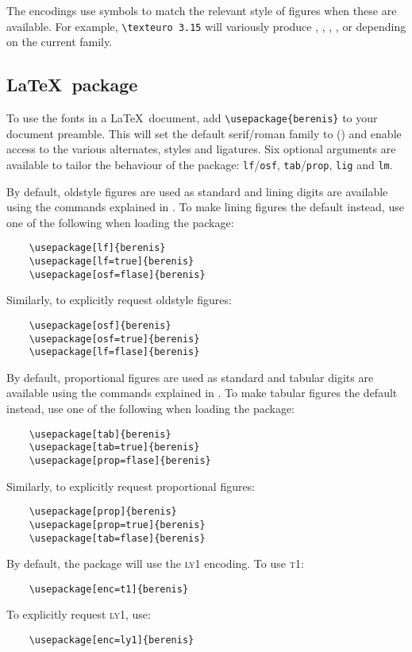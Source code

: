 \documentclass[11pt,british]{article}
\begin{document}
The encodings use symbols to match the relevant style of figures when these are available. For example, \verb|\texteuro 3.15| will variously produce , , , ,  or  depending on the current family.


\subsection{\LaTeX\ package}

To use the fonts in a \LaTeX\ document, add \verb|\usepackage{berenis}| to your document preamble. This will set the default serif/roman family to  () and enable access to the various alternates, styles and ligatures. Six optional arguments are available to tailor the behaviour of the package: \verb|lf|/\verb|osf|, \verb|tab|/\verb|prop|, \verb|lig| and \verb|lm|.

By default, oldstyle figures are used as standard and lining digits are available using the commands explained in . To make lining figures the default instead, use one of the following when loading the package:
\begin{verbatim}
	\usepackage[lf]{berenis}
	\usepackage[lf=true]{berenis}
	\usepackage[osf=flase]{berenis}
\end{verbatim}
Similarly, to explicitly request oldstyle figures:
\begin{verbatim}
	\usepackage[osf]{berenis}
	\usepackage[osf=true]{berenis}
	\usepackage[lf=flase]{berenis}
\end{verbatim}

By default, proportional figures are used as standard and tabular digits are available using the commands explained in . To make tabular figures the default instead, use one of the following when loading the package:
\begin{verbatim}
	\usepackage[tab]{berenis}
	\usepackage[tab=true]{berenis}
	\usepackage[prop=flase]{berenis}
\end{verbatim}
Similarly, to explicitly request proportional figures:
\begin{verbatim}
	\usepackage[prop]{berenis}
	\usepackage[prop=true]{berenis}
	\usepackage[tab=flase]{berenis}
\end{verbatim}

By default, the package will use the \textsc{ly1} encoding. To use \textsc{t1}:
\begin{verbatim}
	\usepackage[enc=t1]{berenis}
\end{verbatim}
To explicitly request \textsc{ly1}, use:
\begin{verbatim}
	\usepackage[enc=ly1]{berenis}
\end{verbatim}
\end{document}
